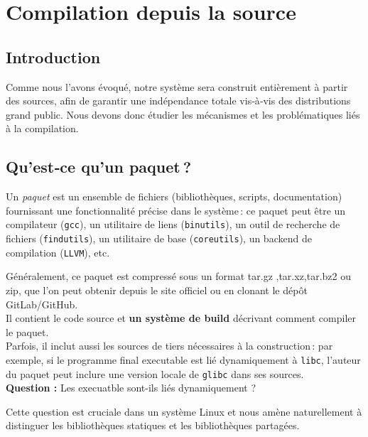 \chapter{Compilation depuis la source} 
\minitoc
\label{ssse:compilation-source}

\clearpage


\section{Introduction}
Comme nous l'avons évoqué, notre système sera construit entièrement à partir des sources, afin de garantir une indépendance totale vis‑à‑vis des distributions grand public. Nous devons donc étudier les mécanismes et les problématiques liés à la compilation.


\section{Qu’est‑ce qu’un paquet ?}
\label{sssec:definition-paquet}

Un \emph{paquet} est un ensemble de fichiers (bibliothèques, scripts, documentation) fournissant une fonctionnalité précise dans le système : ce paquet peut être un compilateur (\texttt{gcc}), un utilitaire de liens (\texttt{binutils}), un outil de recherche de fichiers (\texttt{findutils}), un utilitaire de base (\texttt{coreutils}), un backend de compilation (\texttt{LLVM}), etc.

Généralement, ce paquet est compressé sous un format tar.gz ,tar.xz,tar.bz2 ou zip, que l’on peut obtenir depuis le site officiel ou en clonant le dépôt GitLab/GitHub.\\
Il contient le code source  et \textbf{un système de build} décrivant comment compiler le paquet.\\ Parfois, il inclut aussi les sources de tiers nécessaires à la construction : par exemple, si le programme final executable est lié dynamiquement à \texttt{libc}, l’auteur du paquet peut inclure une version locale de \texttt{glibc}  dans ses sources.\\
\bigbreak
\textbf{Question :} Les execuatble  sont-ils liés dynamiquement ? 

Cette question est cruciale dans un système Linux et nous amène naturellement à distinguer les bibliothèques statiques et les bibliothèques partagées.

